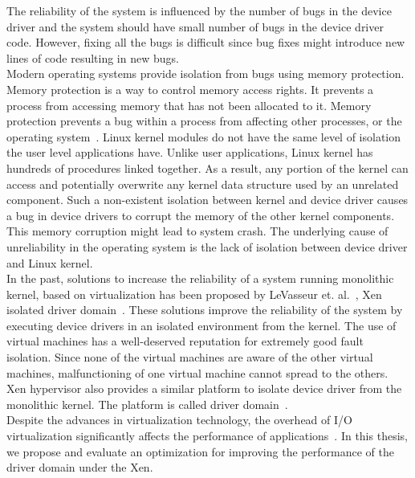 The reliability of the system is influenced by the number of bugs in the device driver and the system should have small number of bugs in the device driver code. However, fixing all the bugs is difficult since bug fixes might introduce new lines of code resulting in new bugs. 
\\
Modern operating systems provide isolation from bugs using memory protection. Memory protection is a way to control memory access rights. It prevents a process from accessing memory that has not been allocated to it. Memory protection prevents a bug within a process from affecting other processes, or the operating system~\cite{Denning:1970:VM:356571.356573, Galvin}. Linux kernel modules do not have the same level of isolation the user level applications have. Unlike user applications, Linux kernel has hundreds of procedures linked together. As a result, any portion of the kernel can access and potentially overwrite any kernel data structure used by an unrelated component. Such a non-existent isolation between kernel and device driver causes a bug in device drivers to corrupt the memory of the other kernel components. This memory corruption might lead to system crash. The underlying cause of unreliability in the operating system is the lack of isolation between device driver and Linux kernel.
\\
In the past, solutions to increase the reliability of a system running monolithic kernel, based on virtualization has been proposed by LeVasseur et. al.~\cite{LeVasseur04UnmodifiedDriverReuse}, Xen isolated driver domain~\cite{Fraser04safehardware}. These solutions improve the reliability of the system by executing device drivers in an isolated environment from the kernel. The use of virtual machines has a well-deserved reputation for extremely good fault isolation. Since none of the virtual machines are aware of the other virtual machines, malfunctioning of one virtual machine cannot spread to the others. Xen hypervisor also provides a similar platform to isolate device driver from the monolithic kernel. The platform is called driver domain~\cite{driverdomain}.
\\
Despite the advances in virtualization technology, the overhead of I/O virtualization significantly affects the performance of applications~\cite{Barham:2003:XAV:945445.945462, Sugerman:2001:VID:647055.715774, Menon:2006:ONV:1267359.1267361}. In this thesis, we propose and evaluate an optimization for improving the performance of the driver domain under the Xen. 

\pagebreak
  
